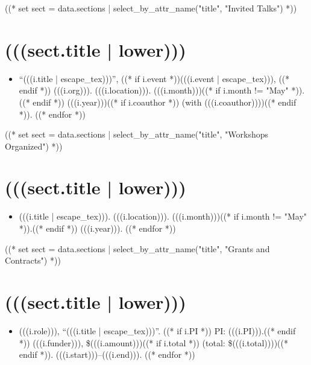 \documentclass[11pt,article,oneside]{memoir}
\begin{document}
((* set sect = data.sections | select_by_attr_name("title", "Invited Talks") *))
\section{(((sect.title | lower)))}

\mbox{}\vspace{-\dimexpr\baselineskip\relax}

\begin{itemize}[label={}]
((* for i in sect.entries.talks | sort_by_attr(["year"], reverse=True) *))
\item \enquote{(((i.title | escape_tex)))}, ((* if i.event *))(((i.event | escape_tex))), ((* endif *)) (((i.org))). (((i.location))). (((i.month)))((* if i.month != "May" *)).((* endif *)) (((i.year)))((* if i.coauthor *)) (with (((i.coauthor))))((* endif *)).
((* endfor *))
\end{itemize}

((* set sect = data.sections | select_by_attr_name("title", "Workshops Organized") *))
\section{(((sect.title | lower)))}

\mbox{}\vspace{-\dimexpr\baselineskip\relax}

\begin{itemize}[label={}]
((* for i in sect.entries.workshops | sort_by_attr(["year"], reverse=True) *))
\item (((i.title | escape_tex))). (((i.location))). (((i.month)))((* if i.month != "May" *)).((* endif *)) (((i.year))).
((* endfor *))
\end{itemize}

((* set sect = data.sections | select_by_attr_name("title", "Grants and Contracts") *))
\section{(((sect.title | lower)))}

\mbox{}\vspace{-\dimexpr\baselineskip\relax}

\begin{itemize}[label={}]
((* for i in sect.entries.grants | sort_by_attr(["start"], reverse=True) *))
\item (((i.role))), \enquote{(((i.title | escape_tex)))}. ((* if i.PI *)) PI: (((i.PI))).((* endif *)) (((i.funder))), \$(((i.amount)))((* if i.total *)) (total: \$(((i.total))))((* endif *)). (((i.start)))--(((i.end))).
((* endfor *))
\end{itemize}
\end{document}
